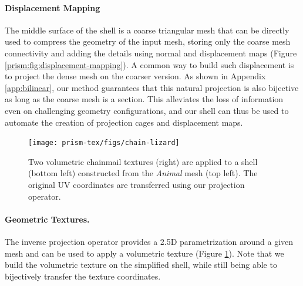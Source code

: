 \paragraph{Displacement Mapping}
The middle surface of the shell is a coarse triangular mesh that can be directly used to compress the geometry of the input mesh, storing only the coarse mesh connectivity and adding the details using normal and displacement maps (Figure \ref{prism:fig:displacement-mapping}). A common way to build such displacement is to project {\cite{kobbelt1998interactive,collins2002mesh}} the dense mesh on the coarser version. As shown in Appendix \ref{app:bilinear}, our method guarantees that this natural projection is also bijective as long as the coarse mesh is a section. This 
{alleviates the loss of information}
even on challenging geometry configurations, and our shell can thus be used to automate the creation of projection cages and displacement maps.



\begin{figure}
    \centering
    \texttt{[image: prism-tex/figs/chain-lizard]}
    \caption{Two volumetric chainmail textures (right) are applied to a shell (bottom left) constructed from the \emph{Animal} mesh (top left).
    The original UV coordinates are transferred using our projection operator.}
    \label{prism:fig:volumetric-textures}
    
\end{figure}
\paragraph{Geometric Textures.}
The inverse projection operator provides a 2.5D parametrization around a given mesh and can be used to apply a volumetric texture (Figure \ref{prism:fig:volumetric-textures}).
Note that we build the volumetric texture on the simplified shell, while still being able to bijectively transfer the texture coordinates.




